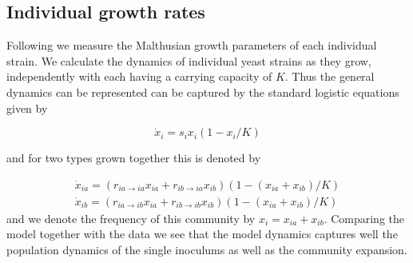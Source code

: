 \subsection{Individual growth rates}

Following \citep{lenski:AmNat:1991} we measure the Malthusian growth parameters of each individual strain.
We calculate the dynamics of individual yeast strains as they grow, independently with each having a carrying capacity of $K$.
Thus the general dynamics can be represented can be captured by the standard logistic equations given by

\begin{equation}
	\dot{x}_i = s_i x_i (1 - x_i/K) 
\end{equation}

and for two types grown together this is denoted by

\begin{align}
	\dot{x}_{ia} = (r_{ia \rightarrow ia } x_{ia} + r_{ib \rightarrow ia } x_{ib})  (1 - (x_{ia}+x_{ib})/K) \nonumber \\
	\dot{x}_{ib} = (r_{ia \rightarrow ib } x_{ia} + r_{ib \rightarrow ib } x_{ib}) (1 - (x_{ia}+x_{ib})/K)
\end{align}
and we denote the frequency of this community by $x_i = x_{ia} + x_{ib}$.
Comparing the model together with the data we see that the model dynamics captures well the population dynamics of the single inoculums as well as the community expansion.